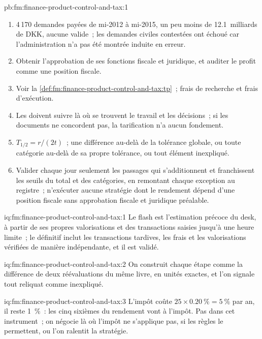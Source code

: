 \begin{solution}{pb:fm:finance-product-control-and-tax:1}
\begin{enumerate}
\item 4\,170 demandes payées de mi-2012 à mi-2015, un peu moins de 12.1~milliards de DKK, aucune valide~; les demandes civiles contestées ont échoué car
l'administration n'a pas été montrée induite en erreur.
\item Obtenir l'approbation de ses fonctions fiscale et juridique, et auditer le profit comme une position fiscale.
\item Voir la \cref{def:fm:finance-product-control-and-tax:tp}~; frais de recherche et frais d'exécution.
\item Les  doivent suivre là où se trouvent le travail et les décisions~; si les documents ne concordent pas, la tarification n'a aucun fondement.
\item $T_{1/2}=r/(2t)$~; une différence au-delà de la tolérance globale, ou toute catégorie au-delà de sa propre tolérance, ou tout élément inexpliqué.
\item Valider chaque jour seulement les passages qui s'additionnent et franchissent les seuils du total et des catégories, en remontant chaque exception au registre~; n'exécuter aucune stratégie dont le
rendement dépend d'une position fiscale sans approbation fiscale et juridique préalable.
\end{enumerate}
\end{solution}

\begin{solution}{iq:fm:finance-product-control-and-tax:1}
Le flash est l'estimation précoce du desk, à partir de ses propres valorisations et des transactions saisies jusqu'à une heure limite~; le définitif inclut les transactions tardives, les frais et
les valorisations vérifiées de manière indépendante, et il est validé.
\end{solution}

\begin{solution}{iq:fm:finance-product-control-and-tax:2}
On construit chaque étape comme la différence de deux réévaluations du même livre, en unités exactes, et l'on signale tout reliquat comme inexpliqué.
\end{solution}

\begin{solution}{iq:fm:finance-product-control-and-tax:3}
L'impôt coûte $25\times0.20~\%=5~\%$ par an, il reste 1~\%~: les cinq sixièmes du rendement vont à l'impôt. Pas dans cet instrument~; on négocie là où
l'impôt ne s'applique pas, si les règles le permettent, ou l'on ralentit la stratégie.
\end{solution}

